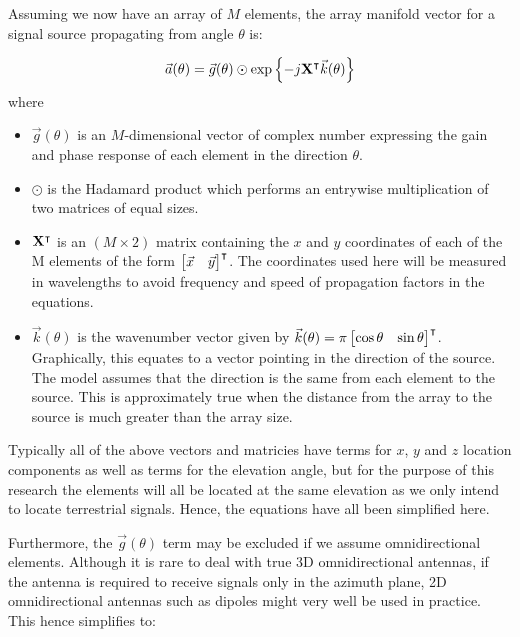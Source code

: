 Assuming we now have an array of \(M\) elements, the array manifold vector for a signal source propagating from angle \(\theta\) is: \cite{dacos1995estimating}

\begin{equation}
  \vec{a}(\theta) = \vec{g}(\theta) \odot \exp \left\{ -j \mathbf{X}^\intercal \vec{k}(\theta) \right\}
\end{equation}
where
\begin{itemize}
  \item \(\vec{g}(\theta)\) is an \(M\)-dimensional vector of complex number expressing the gain and phase response  of each element in the direction \(\theta\).
  \item \(\odot\) is the Hadamard product which performs an entrywise multiplication of two matrices of equal sizes.
\item \(\mathbf{X}^\intercal\) is an \((M \times 2)\) matrix containing the \(x\) and \(y\) coordinates of each of the M elements of the form \(\begin{bmatrix} \vec{x} & \vec{y} \end{bmatrix}^\intercal\). The coordinates used here will be measured in wavelengths to avoid frequency and speed of propagation factors in the equations.
\item \(\vec{k}(\theta)\) is the wavenumber vector given by \(\vec{k}(\theta) = \pi \begin{bmatrix} \cos\theta & \sin\theta \end{bmatrix}^\intercal \). Graphically, this equates to a vector pointing in the direction of the source. The model assumes that the direction is the same from each element to the source. This is approximately true when the distance from the array to the source is much greater than the array size.
\end{itemize}

Typically all of the above vectors and matricies have terms for \(x\), \(y\) and \(z\) location components as well as terms for the elevation angle, but for the purpose of this research the elements will all be located at the same elevation as we only intend to locate terrestrial signals. Hence, the equations have all been simplified here.

Furthermore, the \(\vec{g}(\theta)\) term may be excluded if we assume omnidirectional elements. Although it is rare to deal with true 3D omnidirectional antennas, if the antenna is required to receive signals only in the azimuth plane, 2D omnidirectional antennas such as dipoles might very well be used in practice. This hence simplifies to:

